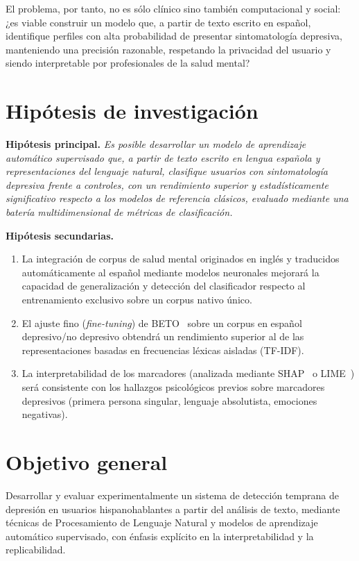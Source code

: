 \documentclass[12pt,a4paper,spanish]{article}
\begin{document}
El problema, por tanto, no es sólo clínico sino también computacional y social: ¿es viable construir un modelo que, a partir de texto escrito en español, identifique perfiles con alta probabilidad de presentar sintomatología depresiva, manteniendo una precisión razonable, respetando la privacidad del usuario y siendo interpretable por profesionales de la salud mental?

\section{Hipótesis de investigación}

\textbf{Hipótesis principal.} \emph{Es posible desarrollar un modelo de aprendizaje automático supervisado que, a partir de texto escrito en lengua española y representaciones del lenguaje natural, clasifique usuarios con sintomatología depresiva frente a controles, con un rendimiento superior y estadísticamente significativo respecto a los modelos de referencia clásicos, evaluado mediante una batería multidimensional de métricas de clasificación.}

\textbf{Hipótesis secundarias.}
\begin{enumerate}[leftmargin=2em]
    \item La integración de corpus de salud mental originados en inglés y traducidos automáticamente al español mediante modelos neuronales mejorará la capacidad de generalización y detección del clasificador respecto al entrenamiento exclusivo sobre un corpus nativo único.
    \item El ajuste fino (\emph{fine-tuning}) de BETO~\cite{betohf} sobre un corpus en español depresivo/no depresivo obtendrá un rendimiento superior al de las representaciones basadas en frecuencias léxicas aisladas (TF-IDF).
    \item La interpretabilidad de los marcadores (analizada mediante SHAP~\cite{yanez2023upm} o LIME~\cite{frontiers2025xai}) será consistente con los hallazgos psicológicos previos sobre marcadores depresivos (primera persona singular, lenguaje absolutista, emociones negativas).
\end{enumerate}

\section{Objetivo general}

Desarrollar y evaluar experimentalmente un sistema de detección temprana de depresión en usuarios hispanohablantes a partir del análisis de texto, mediante técnicas de Procesamiento de Lenguaje Natural y modelos de aprendizaje automático supervisado, con énfasis explícito en la interpretabilidad y la replicabilidad.
\end{document}
